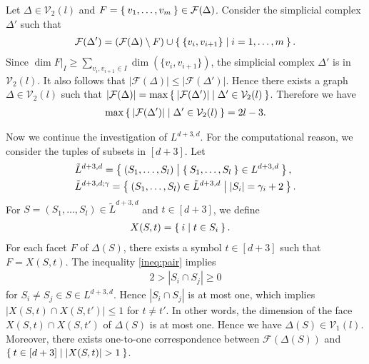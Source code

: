 \documentclass{wstmp}
\begin{document}
\begin{remark}
Let $\Delta\in{\mathcal{V}}_2(l)$ and $F=\Set{v_1,\ldots,v_m}\in{\mathcal{F}}(\Delta)$.
Consider the simplicial complex $\Delta'$ such that
\begin{align*}
{\mathcal{F}}(\Delta')=({\mathcal{F}}(\Delta)\setminus F)\cup \Set{\{v_i,v_{i+1}\}|i=1,\ldots,m}.
\end{align*}
Since $\dim F|_I\geq \sum_{v_i,v_{i+1}\in I} \dim(\{v_i,v_{i+1}\})$, 
the simplicial complex $\Delta'$ is in ${\mathcal{V}}_2(l)$.
It also follows that ${\left|{{\mathcal{F}}(\Delta)}\right|}\leq {\left|{{\mathcal{F}}(\Delta')}\right|}$.
Hence there exists a graph $\Delta\in{\mathcal{V}}_2(l)$
such that ${\left|{{\mathcal{F}}(\Delta)}\right|}=\max\Set{{\left|{{\mathcal{F}}(\Delta')}\right|}|\Delta'\in{\mathcal{V}}_2(l)}$.
Therefore we have
\begin{align*}
\max\Set{{\left|{{\mathcal{F}}(\Delta')}\right|}|\Delta'\in{\mathcal{V}}_2(l)}=2l-3 .
\end{align*}
\end{remark}

Now we continue the investigation of $L^{d+3,d}$.
For the computational reason,
we consider the tuples of subsets in $[d+3]$.
Let 
\begin{align*}
&\tilde L^{d+3,d}=\Set{(S_1,\ldots,S_l)| \Set{S_1,\ldots,S_l}\in L^{d+3,d}}, \\
&\tilde L^{d+3,d;\gamma}=\Set{(S_1,\ldots,S_l)\in
\tilde L^{d+3,d}| {\left|{S_i}\right|}=\gamma_i+2}.
\end{align*}
For  $S=(S_1,\ldots,S_l) \in \tilde L^{d+3,d}$ and $t \in [d+3]$,
we define 
\begin{align*}
X(S,t) &=\Set{ i | t \in S_i }.
\end{align*}
For each facet $F$ of $\Delta(S)$, 
there exists a symbol $t \in [d+3]$ such that $F=X(S,t)$.
The inequality \eqref{ineq:pair} implies
\begin{align*}
2>{\left|{S_i \cap S_j}\right|} \geq 0
\end{align*}
for $S_i\neq S_j \in S \in L^{d+3,d}$.
Hence 
${\left|{S_i \cap S_j}\right|}$ is at most one,
which implies
${\left|{X(S,t)\cap X(S,t')}\right|}\leq 1$ for $t\neq t'$.
In other words,
the dimension of the face
$X(S,t) \cap X(S,t')$ of $\Delta(S)$
is at most one.
Hence we have $\Delta(S)\in {\mathcal{V}}_1(l)$.
Moreover, there exists one-to-one correspondence between 
${\mathcal{F}}(\Delta(S))$
and $\Set{t \in [d+3] | {\left|{X(S,t)}\right|}>1}$.
\end{document}
